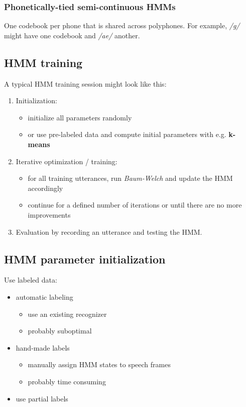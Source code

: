 \subsubsection{Phonetically-tied semi-continuous HMMs}
One codebook per phone that is shared across polyphones. For example, \textit{/g/} might have one codebook and \textit{/ae/} another.

\subsection{HMM training}

A typical HMM training session might look like this:
\begin{enumerate}
    \item Initialization:
        \begin{itemize}
            \item initialize all parameters randomly
            \item or use pre-labeled data and compute initial parameters with e.g. \textbf{k-means}
        \end{itemize}
    \item Iterative optimization / training:
        \begin{itemize}
            \item for all training utterances, run \textit{Baum-Welch} and update the HMM accordingly
            \item continue for a defined number of iterations or until there are no more improvements
        \end{itemize}
    \item Evaluation by recording an utterance and testing the HMM.
\end{enumerate}

\subsection{HMM parameter initialization}

Use labeled data:
\begin{itemize}
    \item automatic labeling
        \begin{itemize}
            \item use an existing recognizer
            \item probably suboptimal
        \end{itemize}
    \item hand-made labels
        \begin{itemize}
            \item manually assign HMM states to speech frames
            \item probably time consuming
        \end{itemize}
    \item use partial labels
\end{itemize}

